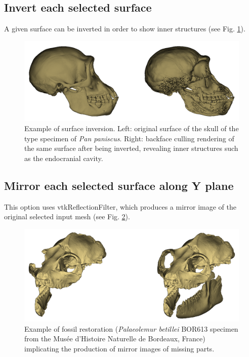 \subsection{Invert each selected surface}

A given surface can be inverted in order to show inner structures (see Fig. \ref{inversion}).\\


\begin{figure}
  \centering
  \includegraphics[scale=0.32]{images/09/structure/inversion_example.png} 
	\caption{Example of surface inversion. Left: original surface of the skull of the type specimen of \textit{Pan paniscus}.
Right: backface culling rendering of the same surface after being inverted, revealing inner structures such as the endocranial cavity. }
\label{inversion}
 
\end{figure}

\subsection{Mirror each selected surface along Y plane}

This option uses vtkReflectionFilter, which produces a mirror image of the original selected input mesh (see Fig. \ref{mirror}).\\

\begin{figure}
  \centering
  \includegraphics[scale=0.32]{images/09/structure/image_mirror.png} 
	\caption{Example of fossil restoration (\textit{Palaeolemur betillei} BOR613 specimen from the Musée d'Histoire Naturelle de Bordeaux, France) implicating the production of mirror images of missing parts.}
 \label{mirror}
\end{figure}






